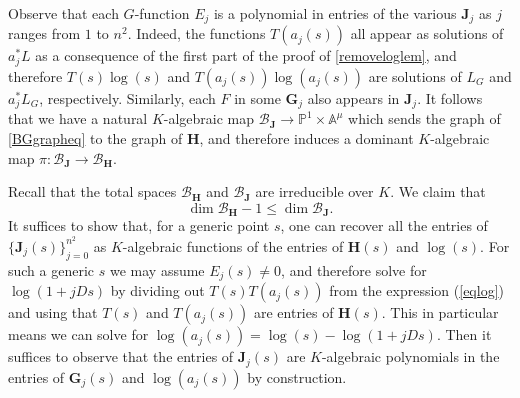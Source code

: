 \documentclass[10pt]{article}
\numberwithin{equation}{section}
\theoremstyle{plain}
\theoremstyle{definition}
\theoremstyle{remark}
\begin{document}


Observe that each $G$-function $E_{j}$ is a polynomial in entries of the various $\mathbf{J}_{j}$ as $j$ ranges from $1$ to $n^2$. Indeed, the functions $T(a_{j}(s))$ all appear as solutions of $a^{*}_{j} L$ as a consequence of the first part of the proof of \autoref{removeloglem}, and therefore $T(s) \log(s)$ and $T(a_{j}(s)) \log(a_{j}(s))$ are solutions of $L_{G}$ and $a^{*}_{j} L_{G}$, respectively. Similarly, each $F$ in some $\mathbf{G}_{j}$ also appears in $\mathbf{J}_{j}$. It follows that we have a natural $K$-algebraic map $\mathcal{B}_{\mathbf{J}} \to \mathbb{P}^1 \times \mathbb{A}^{\mu}$ which sends the graph of \eqref{BGgrapheq} to the graph of $\mathbf{H}$, and therefore induces a dominant $K$-algebraic map $\pi : \mathcal{B}_{\mathbf{J}} \to \mathcal{B}_{\mathbf{H}}$. 

Recall that the total spaces $\mathcal{B}_{\mathbf{H}}$ and $\mathcal{B}_{\mathbf{J}}$ are irreducible over $K$. We claim that
\begin{equation}
\label{Hfibdimeq}
\dim \mathcal{B}_{\mathbf{H}} - 1 \leq \dim \mathcal{B}_{\mathbf{J}} .
\end{equation}
It suffices to show that, for a generic point $s$, one can recover all the entries of $\{ \mathbf{J}_{j}(s) \}^{n^2}_{j=0}$ as $K$-algebraic functions of the entries of $\mathbf{H}(s)$ and $\log(s)$. For such a generic $s$ we may assume $E_{j}(s) \neq 0$, and therefore solve for $\log(1+jDs)$ by dividing out $T(s) T(a_{j}(s))$ from the expression (\ref{eqlog}) and using that $T(s)$ and $T(a_{j}(s))$ are entries of $\mathbf{H}(s)$. This in particular means we can solve for $\log(a_{j}(s)) = \log(s) - \log(1+jDs)$. Then it suffices to observe that the entries of $\mathbf{J}_{j}(s)$ are $K$-algebraic polynomials in the entries of $\mathbf{G}_{j}(s)$ and $\log(a_{j}(s))$ by construction.
\end{document}
